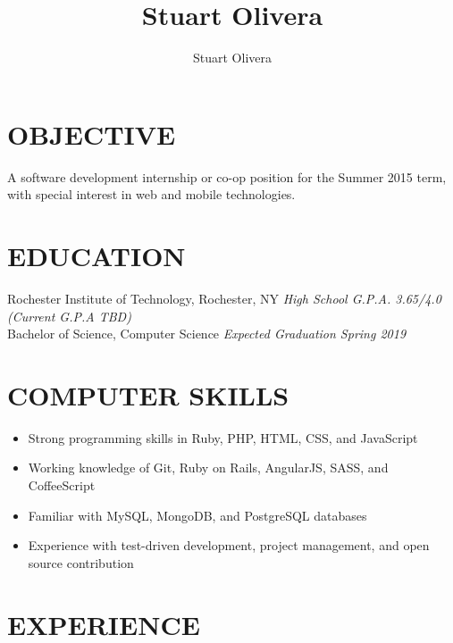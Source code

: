 \documentclass[line]{res}
\author{Stuart Olivera}
\title{Stuart Olivera}
\begin{document}
\setlength{\textheight}{11.5in} %
\address{\large
  42960 Deer Chase Pl
  \\
  Ashburn, VA 20147
  \\
  (703) 509-9523
}
\address{\it
  stuart@stuartolivera.com
  \\
  http://stuartolivera.com/
  \\
  http://linkedin.com/in/stuartolivera
}

\begin{resume}

\section{OBJECTIVE}

  A software development internship or co-op position for the Summer 2015 term, with special interest in web and mobile technologies.

\section{EDUCATION}

  Rochester Institute of Technology, Rochester, NY
  \hfill
  \textit{High School G.P.A. 3.65/4.0 (Current G.P.A TBD)}
  \\
  Bachelor of Science, Computer Science
  \hfill
  \textit{Expected Graduation Spring 2019}

\section{COMPUTER SKILLS}

  \begin{itemize}[leftmargin=10pt]
  \item Strong programming skills in Ruby, PHP, HTML, CSS, and JavaScript
  \item Working knowledge of Git, Ruby on Rails, AngularJS, SASS, and CoffeeScript
  \item Familiar with MySQL, MongoDB, and PostgreSQL databases
  \item Experience with test-driven development, project management, and open source contribution
  \end{itemize}

\section{EXPERIENCE}


\end{resume}
\end{document}
